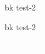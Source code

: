 \documentclass{book}
\begin{document}
\colorbox{mg}{bk test-2}

\newpage
\colorbox{mg}{bk test-2}

\colorbox{mg}{\textcolor{white}{white text}}
\end{document}
